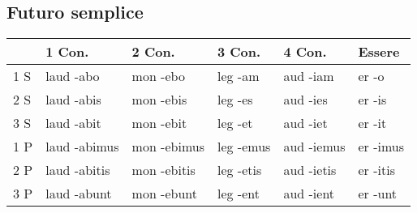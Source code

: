 \subsection{Futuro semplice}


\begin{table}[h!]
     \centering
     \begin{tabular}{|l|l|l|l|l|l|}
        \hline
         & \textbf{1 Con.} & \textbf{2 Con.} & \textbf{3 Con.} & \textbf{4 Con.} & \textbf{Essere} \\
        \hline
         1 S & laud -abo    & mon -ebo    & leg -am   & aud -iam   & er -o\\
        \hline
         2 S & laud -abis   & mon -ebis   & leg -es   & aud -ies   & er -is\\
        \hline
         3 S & laud -abit   & mon -ebit   & leg -et   & aud -iet   & er -it\\
        \hline
         1 P & laud -abimus & mon -ebimus & leg -emus & aud -iemus & er -imus\\
        \hline
         2 P & laud -abitis & mon -ebitis & leg -etis & aud -ietis & er -itis\\
        \hline
         3 P & laud -abunt  & mon -ebunt  & leg -ent  & aud -ient  & er -unt\\
        \hline
     \end{tabular}
\end{table}

